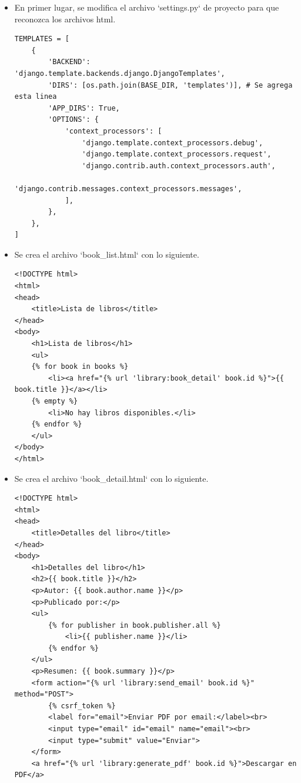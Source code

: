 \documentclass{article}
\begin{document}
\begin{itemize}

\item En primer lugar, se modifica el archivo `settings.py` de proyecto para que reconozca los archivos html.

\begin{lstlisting}[style=python]
TEMPLATES = [
    {
        'BACKEND': 'django.template.backends.django.DjangoTemplates',
        'DIRS': [os.path.join(BASE_DIR, 'templates')], # Se agrega esta linea
        'APP_DIRS': True,
        'OPTIONS': {
            'context_processors': [
                'django.template.context_processors.debug',
                'django.template.context_processors.request',
                'django.contrib.auth.context_processors.auth',
                'django.contrib.messages.context_processors.messages',
            ],
        },
    },
]
\end{lstlisting}

\item Se crea el archivo `book\_list.html` con lo siguiente.
 
\begin{lstlisting}[style=html]
<!DOCTYPE html>
<html>
<head>
    <title>Lista de libros</title>
</head>
<body>
    <h1>Lista de libros</h1>
    <ul>
    {% for book in books %}
        <li><a href="{% url 'library:book_detail' book.id %}">{{ book.title }}</a></li>
    {% empty %}
        <li>No hay libros disponibles.</li>
    {% endfor %}
    </ul>
</body>
</html>
\end{lstlisting}

\item Se crea el archivo `book\_detail.html` con lo siguiente.

\begin{lstlisting}[style=html]
<!DOCTYPE html>
<html>
<head>
    <title>Detalles del libro</title>
</head>
<body>
    <h1>Detalles del libro</h1>
    <h2>{{ book.title }}</h2>
    <p>Autor: {{ book.author.name }}</p>
    <p>Publicado por:</p>
    <ul>
        {% for publisher in book.publisher.all %}
            <li>{{ publisher.name }}</li>
        {% endfor %}
    </ul>
    <p>Resumen: {{ book.summary }}</p>
    <form action="{% url 'library:send_email' book.id %}" method="POST">
        {% csrf_token %}
        <label for="email">Enviar PDF por email:</label><br>
        <input type="email" id="email" name="email"><br>
        <input type="submit" value="Enviar">
    </form>
    <a href="{% url 'library:generate_pdf' book.id %}">Descargar en PDF</a>


\end{lstlisting}
\end{itemize}
\end{document}
